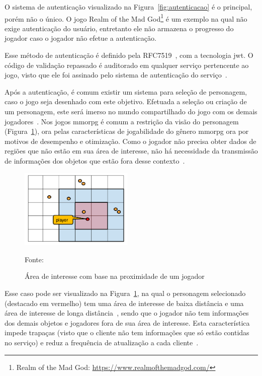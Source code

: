 O sistema de autenticação visualizado na Figura~\ref{fig:autenticacao} é o principal, porém não o único.
%
O jogo Realm of the Mad God\footnote{Realm of the Mad God: \url{https://www.realmofthemadgod.com/}} é um exemplo na qual não exige autenticação do usuário, entretanto ele não armazena o progresso do jogador caso o jogador não efetue a autenticação.


Esse método de autenticação é definido pela RFC7519~\cite{rfc7519}, com a tecnologia \ac{jwt}.
%
O código de validação repassado é auditorado em qualquer serviço pertencente ao jogo, visto que ele foi assinado pelo sistema de autenticação do serviço~\cite{Ikem2018May}.


Após a autenticação, é comum existir um sistema para seleção de personagem, caso o jogo seja desenhado com este objetivo.
%
Efetuada a seleção ou criação de um personagem, este será imerso no mundo compartilhado do jogo com os demais jogadores~\cite{matthiasrudy2011}.
%
Nos jogos \ac{mmorpg} é comum a restrição da visão do personagem (Figura~\ref{fig:proximidade}), ora pelas características de jogabilidade do gênero \ac{mmorpg} ora por motivos de desempenho e otimização.
%
Como o jogador não precisa obter dados de regiões que não estão em sua área de interesse, não há necessidade da transmissão de informações dos objetos que estão fora desse contexto~\cite{albion_online_unite}.

\begin{figure}[htb!]
\caption{Área de interesse com base na proximidade de um jogador}
\label{fig:proximidade}
\includegraphics[height=3.8cm]{img/cap2/proximidade.png}
\centering

Fonte:~\cite{albion_online_unite}
\end{figure}


Esse caso pode ser visualizado na Figura~\ref{fig:proximidade}, na qual o personagem selecionado (destacado em vermelho) tem uma área de interesse de baixa distância e uma área de interesse de longa distância~\cite{albion_online_unite}, sendo que o jogador não tem informações dos demais objetos e jogadores fora de sua área de interesse.
%
Esta característica impede trapaças (visto que o cliente não tem informações que só estão contidas no serviço) e reduz a frequência de atualização a cada cliente~\cite{albion_online_unite}.


